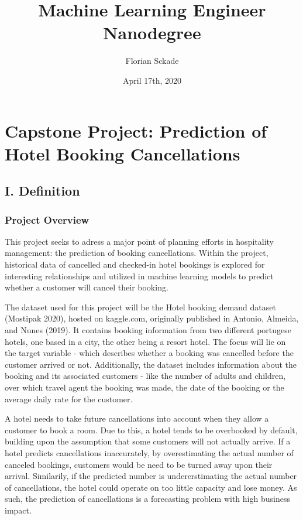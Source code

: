 \documentclass[
]{article}
\title{Machine Learning Engineer Nanodegree}
\author{Florian Sckade}
\date{April 17th, 2020}
\begin{document}
\maketitle

\hypertarget{capstone-project-prediction-of-hotel-booking-cancellations}{%
\section{Capstone Project: Prediction of Hotel Booking
Cancellations}\label{capstone-project-prediction-of-hotel-booking-cancellations}}

\hypertarget{i.-definition}{%
\subsection{I. Definition}\label{i.-definition}}

\hypertarget{project-overview}{%
\subsubsection{Project Overview}\label{project-overview}}

This project seeks to adress a major point of planning efforts in
hospitality management: the prediction of booking cancellations. Within
the project, historical data of cancelled and checked-in hotel bookings
is explored for interesting relationships and utilized in machine
learning models to predict whether a customer will cancel their booking.

The dataset used for this project will be the Hotel booking demand
dataset (Mostipak 2020), hosted on kaggle.com, originally published in
Antonio, Almeida, and Nunes (2019). It contains booking information from
two different portugese hotels, one based in a city, the other being a
resort hotel. The focus will lie on the target variable - which
describes whether a booking was cancelled before the customer arrived or
not. Additionally, the dataset includes information about the booking
and its associated customers - like the number of adults and children,
over which travel agent the booking was made, the date of the booking or
the average daily rate for the customer.

A hotel needs to take future cancellations into account when they allow
a customer to book a room. Due to this, a hotel tends to be overbooked
by default, building upon the assumption that some customers will not
actually arrive. If a hotel predicts cancellations inaccurately, by
overestimating the actual number of canceled bookings, customers would
be need to be turned away upon their arrival. Similarily, if the
predicted number is undererstimating the actual number of cancellations,
the hotel could operate on too little capacity and lose money. As such,
the prediction of cancellations is a forecasting problem with high
business impact.
\end{document}
